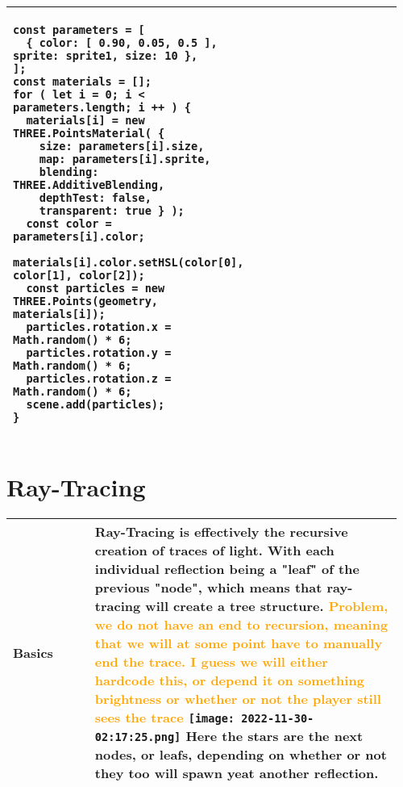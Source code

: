 \documentclass[main.tex,fontsize=8pt,paper=a4,paper=portrait,DIV=calc,]{scrartcl}
\begin{document}
\begin{table}[ht!]
\begin{tabular}{|m{0.2\linewidth}|m{0.755\linewidth}|}
\begin{lstlisting}
const parameters = [
  { color: [ 0.90, 0.05, 0.5 ], sprite: sprite1, size: 10 },
];
const materials = [];
for ( let i = 0; i < parameters.length; i ++ ) {
  materials[i] = new THREE.PointsMaterial( {
    size: parameters[i].size,
    map: parameters[i].sprite,
    blending: THREE.AdditiveBlending,
    depthTest: false,
    transparent: true } );
  const color = parameters[i].color;
  materials[i].color.setHSL(color[0], color[1], color[2]);
  const particles = new THREE.Points(geometry, materials[i]);
  particles.rotation.x = Math.random() * 6;
  particles.rotation.y = Math.random() * 6;
  particles.rotation.z = Math.random() * 6;
  scene.add(particles);
}
\end{lstlisting}\\
\hline
\end{tabular}
\end{table}
\pagebreak
\begin{table}[ht!]
\section{Ray-Tracing}
\begin{tabular}{|m{0.2\linewidth}|m{0.755\linewidth}|}
\hline
Basics & 
Ray-Tracing is effectively the recursive creation of traces of light. With each individual reflection being a "leaf" of the previous "node", which means that ray-tracing will create a tree structure.\newline
\textcolor{orange}{Problem, we do not have an end to recursion, meaning that we will at some point have to manually end the trace.\newline
I guess we will either hardcode this, or depend it on something brightness or whether or not the player still sees the trace}\newline
\texttt{[image: 2022-11-30-02:17:25.png]}\newline
Here the stars are the next nodes, or leafs, depending on whether or not they too will spawn yeat another reflection.\\
\hline

\hline

\hline

\hline

\hline

\hline

\hline

\hline

\hline

\hline
\end{tabular}
\end{table}
\end{document}

